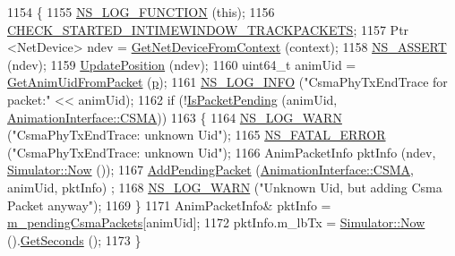 \begin{DoxyCode}
1154 \{
1155   \hyperlink{log-macros-disabled_8h_a90b90d5bad1f39cb1b64923ea94c0761}{NS\_LOG\_FUNCTION} (\textcolor{keyword}{this});
1156   \hyperlink{animation-interface_8h_acdf351a3155a6ccf1813189e10dba8f5}{CHECK\_STARTED\_INTIMEWINDOW\_TRACKPACKETS};
1157   Ptr <NetDevice> ndev = \hyperlink{classns3_1_1AnimationInterface_a5054e94f0c5e3d0a4443cfbe52e2ea30}{GetNetDeviceFromContext} (context);
1158   \hyperlink{assert_8h_a6dccdb0de9b252f60088ce281c49d052}{NS\_ASSERT} (ndev);
1159   \hyperlink{classns3_1_1AnimationInterface_ab751cf6f459289f0978f4bb97b93044d}{UpdatePosition} (ndev);
1160   uint64\_t animUid = \hyperlink{classns3_1_1AnimationInterface_a18e6a184ccd7dee800bf734f8adc818c}{GetAnimUidFromPacket} (\hyperlink{lte__link__budget_8m_ac9de518908a968428863f829398a4e62}{p});
1161   \hyperlink{group__logging_gafbd73ee2cf9f26b319f49086d8e860fb}{NS\_LOG\_INFO} (\textcolor{stringliteral}{"CsmaPhyTxEndTrace for packet:"} << animUid);
1162   \textcolor{keywordflow}{if} (!\hyperlink{classns3_1_1AnimationInterface_a0bee27aa30e136d5035050ec2ef0012d}{IsPacketPending} (animUid, \hyperlink{classns3_1_1AnimationInterface_a801a4efd553ff0d1d768cd70d22456b6a5fb0f9f61327638f165213b90492cfa7}{AnimationInterface::CSMA}))
1163     \{
1164       \hyperlink{group__logging_gade7208b4009cdf0e25783cd26766f559}{NS\_LOG\_WARN} (\textcolor{stringliteral}{"CsmaPhyTxEndTrace: unknown Uid"}); 
1165       \hyperlink{group__fatal_ga5131d5e3f75d7d4cbfd706ac456fdc85}{NS\_FATAL\_ERROR} (\textcolor{stringliteral}{"CsmaPhyTxEndTrace: unknown Uid"}); 
1166       AnimPacketInfo pktInfo (ndev, \hyperlink{classns3_1_1Simulator_ac3178fa975b419f7875e7105be122800}{Simulator::Now} ());
1167       \hyperlink{classns3_1_1AnimationInterface_ab7f3bc1843610f2d9514ddf5d756eaa5}{AddPendingPacket} (\hyperlink{classns3_1_1AnimationInterface_a801a4efd553ff0d1d768cd70d22456b6a5fb0f9f61327638f165213b90492cfa7}{AnimationInterface::CSMA}, animUid, pktInfo)
      ;
1168       \hyperlink{group__logging_gade7208b4009cdf0e25783cd26766f559}{NS\_LOG\_WARN} (\textcolor{stringliteral}{"Unknown Uid, but adding Csma Packet anyway"});
1169     \}
1171   AnimPacketInfo& pktInfo = \hyperlink{classns3_1_1AnimationInterface_ae80a577d450396d34df2499ec2c3c6ec}{m\_pendingCsmaPackets}[animUid];
1172   pktInfo.m\_lbTx = \hyperlink{classns3_1_1Simulator_ac3178fa975b419f7875e7105be122800}{Simulator::Now} ().\hyperlink{classns3_1_1Time_a8f20d5c3b0902d7b4320982f340b57c8}{GetSeconds} ();
1173 \}
\end{DoxyCode}


